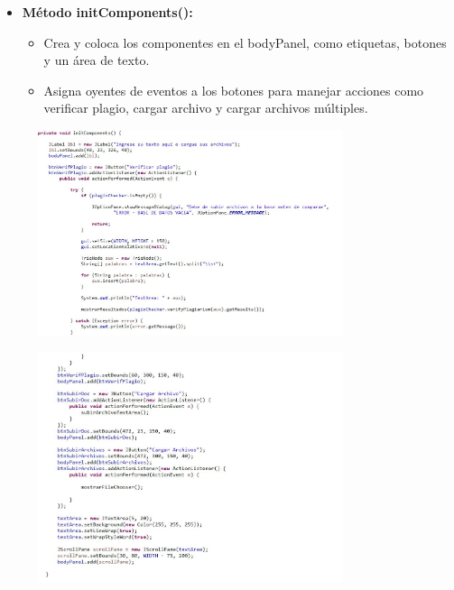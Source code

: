 \documentclass{article}
\begin{document}
	\begin{itemize}
\clearpage	
	
	\item \textbf{Método initComponents():}
	 \begin{itemize}
	 \item Crea y coloca los componentes en el bodyPanel, como etiquetas, botones y un área de texto.
	 \item Asigna oyentes de eventos a los botones para manejar acciones como verificar plagio, cargar archivo y cargar archivos múltiples.
	 \end{itemize}
	\end{itemize}
	 \begin{figure}[H]
		\centering
		\includegraphics[width=0.8\textwidth,keepaspectratio]{img/GUI4.1.jpg}
	\end{figure}
	\begin{figure}[H]
		\centering
		\includegraphics[width=0.8\textwidth,keepaspectratio]{img/GUI4.2.jpg}
	\end{figure}
	
\end{document}
